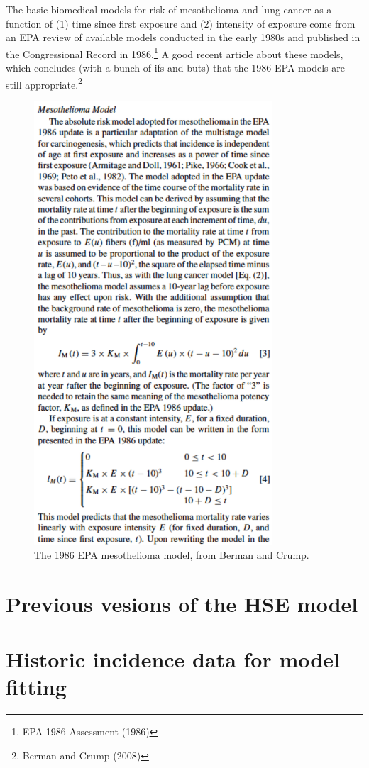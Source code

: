 \documentclass{article}\usepackage{graphicx, color}
\begin{document}
The basic biomedical models for risk of mesothelioma and lung cancer as a function of (1) time since first exposure and (2) intensity of exposure come from an EPA review of available models conducted in the early 1980s and published in the Congressional Record in 1986.\footnote{EPA 1986 Assessment (1986)}  A good recent article about these models, which concludes (with a bunch of ifs and buts) that the 1986 EPA models are still appropriate.\footnote{Berman and Crump (2008)}

\begin{figure}[h!]
  \centering
    \includegraphics[width=3.5in]{EPA_meso_model}
      \caption{The 1986 EPA mesothelioma model, from Berman and Crump.}
\end{figure}

\FloatBarrier
\section{Previous vesions of the HSE model}

\section{Historic incidence data for model fitting}
\end{document}
